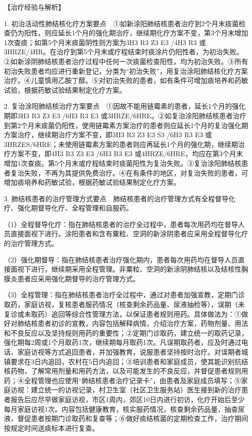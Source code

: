 【治疗经验与解析】

1.
初治活动性肺结核化疗方案要点　①如新涂阳肺结核患者治疗到2个月末痰菌检查仍为阳性，则应延长1个月的强化期治疗，继续期化疗方案不变，第3个月末增加1次查痰；如第5个月末痰菌阴性则方案为3H{3}
R{3} Z{3} E{3} /4H{3} R{3}
或3HRZE/4HR。在治疗到第5个月末或疗程结束时痰涂片仍阳性者，为初治失败。②如新涂阴肺结核患者治疗过程中任何一次痰菌检查阳性，均为初治失败。③所有初治失败患者均应进行重新登记，分类为“初治失败”，用复治涂阳肺结核化疗方案治疗。④儿童慎用乙胺丁醇。⑤对初治失败的患者，如有条件可增加痰培养和药敏试验，根据药敏试验结果制定化疗方案。

2.
复治涂阳肺结核治疗方案要点　①因故不能用链霉素的患者，延长1个月的强化期即3H{3}
R{3} Z{3} E{3} /6H{3} R{3} E{3}
或3HRZE/6HRE。②如复治涂阳肺结核患者治疗到第2个月末痰菌仍阳性，使用链霉素方案治疗的患者则应延长1个月的复治强化期方案治疗，继续期治疗方案不变，即3H{3}
R{3} Z{3} E{3} S{3} /6H{3} R{3} E{3}
或3HRZES/6HRE；未使用链霉素方案的患者则应再延长1个月的强化期，继续期治疗方案不变，即4H{3}
R{3} Z{3} E{3} /6H{3} R{3} E{3}
或4HRZE/6HRE，均应在第3个月末增加1次查痰。第5个月末或疗程结束时痰菌阳性为复治失败。③复治涂阳肺结核患者复治失败，不再为其提供免费治疗。④在有条件的地区，对复治失败的患者，可增加痰培养和药敏试验，根据药敏试验结果制定化疗方案。

3.
肺结核患者的治疗管理方式要点　肺结核患者的治疗管理方式有全程督导化疗、强化期督导化疗、全程管理和自服药。

（1）全程督导化疗：指在肺结核患者的治疗全过程中，患者每次用药均在督导人员直接面视下进行。涂阳患者和含有粟粒、空洞的新涂阴患者应采用全程督导化疗的治疗管理方式。

（2）强化期督导：指在肺结核患者治疗强化期内，患者每次用药均在督导人员直接面视下进行，继续期采用全程管理。非粟粒、空洞的新涂阴肺结核以及结核性胸膜炎患者应采用强化期督导的治疗管理方式。

（3）全程管理：指在肺结核患者治疗全过程中，通过对患者加强宣教，定期门诊取药，家庭访视，复核患者服药情况（核查剩余药品量、尿液抽检等），误期（未复诊或未取药）追回等综合性管理方法，以保证患者规则用药。具体做法为：①做好对肺结核患者初诊的宣教，内容包括解释病情，介绍治疗方案，药物剂量、用法和不良反应以及坚持规则用药的重要性；②定期门诊取药，建立统一的取药记录，强化期每2周或1个月取药1次，继续期每月取药1次。凡误期取药者，应及时通过电话、家庭访视等方式追回患者，并加强教育，说服患者坚持按时治疗。对误期者城镇要求在3日内追回，农村在5日内追回；③培训患者和家庭成员，使其能识别抗结核药物，了解常用剂量和用药方法，以及可能发生的不良反应，并督促患者规则用药；④全程管理也应使用“肺结核患者治疗记录卡”，由患者及家庭成员填写；⑤家庭访视：建立统一的访视记录，村卫生室（社区卫生服务站）医生接到新的治疗患者报告后应尽早做家庭访视，市区1周内，郊区10日内进行初访，化疗开始后至少每月家庭访视1次。内容包括健康教育，核实服药情况，核查剩余药品量，抽查尿液，督促患者按期门诊取药和复查等；⑥做好痰结核菌的定期检查工作，治疗期间按规定时间送痰标本进行复查。


